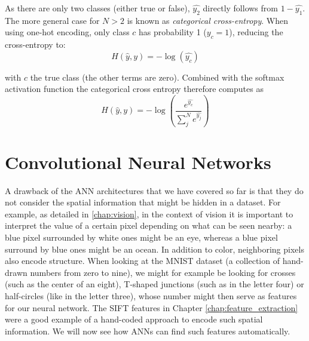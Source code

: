 As there are only two classes (either true or false), $\hat{y_2}$ directly follows from $1-\hat{y_1}$.
The more general case for $N>2$ is known as \textsl{categorical cross-entropy}.
%
When using one-hot encoding, only class $c$ has probability 1 ($y_c=1$), reducing the cross-entropy to:
\begin{equation}
H(\hat{y},y)=-\log(\hat{y_c})
\end{equation}

with $c$ the true class (the other terms are zero). 
Combined with the softmax activation function the categorical cross entropy therefore computes as
\begin{equation}
H(\hat{y},y) = -\log\left(\frac{e^{\hat{y_c}}}{\sum_{j}^N e^{\hat{y_j}}}\right)
\end{equation}

\section{Convolutional Neural Networks}\label{sec:ann:cnn}

A drawback of the ANN architectures that we have covered so far is that they do not consider the spatial information that might be hidden in a dataset.
For example, as detailed in \cref{chap:vision}, in the context of vision it is important to interpret the value of a certain pixel depending on what can be seen nearby: a blue pixel surrounded by white ones might be an eye, whereas a blue pixel surround by blue ones might be an ocean. In addition to color, neighboring pixels also encode structure. When looking at the MNIST dataset (a collection of hand-drawn numbers from zero to nine), we might for example be looking for crosses (such as the center of an eight), T-shaped junctions (such as in the letter four) or half-circles (like in the letter three), whose number might then serve as features for our neural network.
The SIFT features in Chapter \ref{chap:feature_extraction} were a good example of a hand-coded approach to encode such spatial information. We will now see how ANNs can find such features automatically.

